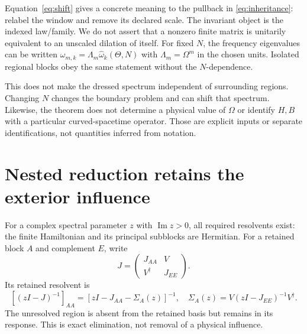 \documentclass[11pt]{article}
\begin{document}
Equation~\eqref{eq:shift} gives a concrete meaning to the pullback in
\eqref{eq:inheritance}: relabel the window and remove its declared scale.
The invariant object is the indexed law/family. We do not assert that a
nonzero finite matrix is unitarily equivalent to an unscaled dilation of
itself. For fixed $N$, the frequency eigenvalues can be written
$\omega_{m,k}=\Lambda_m\widehat\omega_k(\Theta,N)$ with
$\Lambda_m=\Omega^m$ in the chosen units. Isolated regional blocks obey the
same statement without the $N$-dependence.

This does not make the dressed spectrum independent of surrounding regions.
Changing $N$ changes the boundary problem and can shift that spectrum.
Likewise, the theorem does not determine a physical value of $\Omega$ or
identify $H,B$ with a particular curved-spacetime operator. Those are explicit
inputs or separate identifications, not quantities inferred from notation.

\section{Nested reduction retains the exterior influence}
For a complex spectral parameter $z$ with $\operatorname{Im}z>0$, all required
resolvents exist: the finite Hamiltonian and its principal subblocks are
Hermitian. For a retained block $A$ and complement $E$, write
\begin{equation}
 J=\begin{pmatrix}J_{AA}&V\\V^\dagger&J_{EE}\end{pmatrix}.
\end{equation}
Its retained resolvent is
\begin{equation}\label{eq:schur}
 [(zI-J)^{-1}]_{AA}
 =\left[zI-J_{AA}-\Sigma_A(z)\right]^{-1},\quad
 \Sigma_A(z)=V(zI-J_{EE})^{-1}V^\dagger.
\end{equation}
The unresolved region is absent from the retained basis but remains in its
response. This is exact elimination, not removal of a physical influence.
\end{document}
